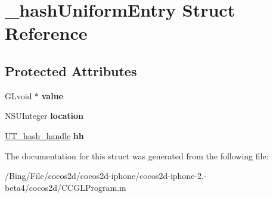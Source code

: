 \hypertarget{struct__hash_uniform_entry}{\section{\-\_\-hash\-Uniform\-Entry Struct Reference}
\label{struct__hash_uniform_entry}
}
\subsection*{Protected Attributes}
\begin{DoxyCompactItemize}
\item 
\hypertarget{struct__hash_uniform_entry_af32eb982cbde16d17ce4154fd1077b9e}{G\-Lvoid $\ast$ {\bfseries value}}\label{struct__hash_uniform_entry_af32eb982cbde16d17ce4154fd1077b9e}

\item 
\hypertarget{struct__hash_uniform_entry_aae5a6da9bd8cc820ce6ad8b4532cc7a1}{N\-S\-U\-Integer {\bfseries location}}\label{struct__hash_uniform_entry_aae5a6da9bd8cc820ce6ad8b4532cc7a1}

\item 
\hypertarget{struct__hash_uniform_entry_a5403836134444667c5285e8ae28231bd}{\hyperlink{struct_u_t__hash__handle}{U\-T\-\_\-hash\-\_\-handle} {\bfseries hh}}\label{struct__hash_uniform_entry_a5403836134444667c5285e8ae28231bd}

\end{DoxyCompactItemize}


The documentation for this struct was generated from the following file\-:\begin{DoxyCompactItemize}
\item 
/\-Bing/\-File/cocos2d/cocos2d-\/iphone/cocos2d-\/iphone-\/2.-\/beta4/cocos2d/C\-C\-G\-L\-Program.\-m\end{DoxyCompactItemize}
